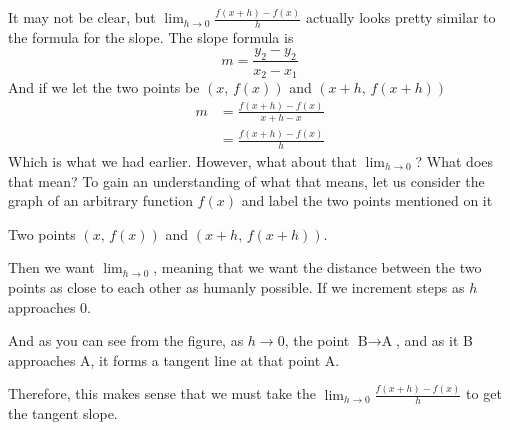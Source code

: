 \documentclass[working]{tuftebook}
\begin{document}
\begin{derivation}
    It may not be clear, but $\displaystyle \lim_{h\to 0} \frac{f(x+h)-f(x)}{h}$ actually looks pretty similar to the formula for the slope. The slope formula is 
    \[
        m= \frac{y_2-y_2}{x_2-x_1}
    \]
    And if we let the two points be $(x,\,f(x))$ and $(x+h,\,f(x+h))$
    \begin{align*}
        m&= \frac{f(x+h)-f(x)}{x+h-x}\\ 
         &= \frac{f(x+h)-f(x)}{h}
    \end{align*}
    Which is what we had earlier. However, what about that $\displaystyle \lim_{h\to 0}$? What does that mean? To gain an understanding of what that means, let us consider the graph of an arbitrary function $f(x)$ and label the two points mentioned on it 
\begin{marginfigure}
    \centering
    \caption{Two points $(x,\,f(x))$ and $(x+h,\,f(x+h))$.}
    \label{fig:x-plus-h}
\end{marginfigure}
Then we want $\displaystyle \lim_{h\to 0}$, meaning that we want the distance between the two points as close to each other as humanly possible. If we increment steps as $h$ approaches 0. 

\begin{figure*}[H]
    \centering
\end{figure*}

And as you can see from the figure, as $h\to0$, the point $\text{B}\to \text{A}$, and as it B approaches A, it forms a tangent line at that point A. 

Therefore, this makes sense that we must take the $\displaystyle \lim_{h\to 0} \frac{f(x+h)-f(x)}{h}$ to get the tangent slope.
\end{derivation}
\end{document}
